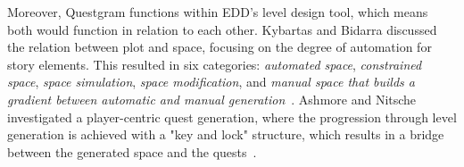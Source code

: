 









Moreover, Questgram functions within EDD's level design tool, which means both would function in relation to each other. Kybartas and Bidarra discussed the relation between plot and space, focusing on the degree of automation for story elements. This resulted in six categories: \emph{automated space}, \emph{constrained space}, \emph{space simulation}, \emph{space modification}, and \emph{manual space that builds a gradient between automatic and manual generation}~. Ashmore and Nitsche investigated a player-centric quest generation, where the progression through level generation is achieved with a "key and lock" structure, which results in a bridge between the generated space and the quests~.

